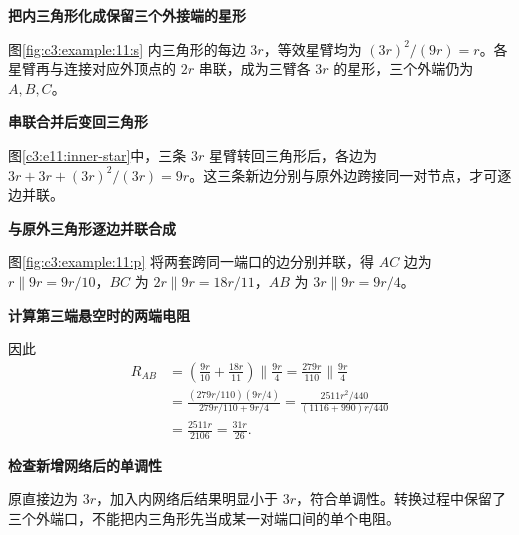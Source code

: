 \begin{solution}\textbf{把内三角形化成保留三个外接端的星形}\par\nobreak
图\ref{fig:c3:example:11:s} 内三角形的每边 $3r$，等效星臂均为 $(3r)^2/(9r)=r$。各星臂再与连接对应外顶点的 $2r$ 串联，成为三臂各 $3r$ 的星形，三个外端仍为 $A,B,C$。


\par\medskip{}\noindent\textbf{串联合并后变回三角形}\par\nobreak
图\ref{c3:e11:inner-star}中，三条 $3r$ 星臂转回三角形后，各边为 $3r+3r+(3r)^2/(3r)=9r$。这三条新边分别与原外边跨接同一对节点，才可逐边并联。




\par\medskip{}\noindent\textbf{与原外三角形逐边并联合成}\par\nobreak
图\ref{fig:c3:example:11:p} 将两套跨同一端口的边分别并联，得 $AC$ 边为 $r\parallel9r=9r/10$，$BC$ 为 $2r\parallel9r=18r/11$，$AB$ 为 $3r\parallel9r=9r/4$。

\par\medskip{}\noindent\textbf{计算第三端悬空时的两端电阻}\par\nobreak
因此
\[
 \begin{aligned}
 R_{AB}&=\left(\frac{9r}{10}+\frac{18r}{11}\right)\parallel\frac{9r}{4}
 =\frac{279r}{110}\parallel\frac{9r}{4}\\
 &=\frac{(279r/110)(9r/4)}{279r/110+9r/4}
 =\frac{2511r^2/440}{(1116+990)r/440}\\
 &=\frac{2511r}{2106}=\frac{31r}{26}.
 \end{aligned}
\]


\par\medskip{}\noindent\textbf{检查新增网络后的单调性}\par\nobreak
原直接边为 $3r$，加入内网络后结果明显小于 $3r$，符合单调性。转换过程中保留了三个外端口，不能把内三角形先当成某一对端口间的单个电阻。\end{solution}
